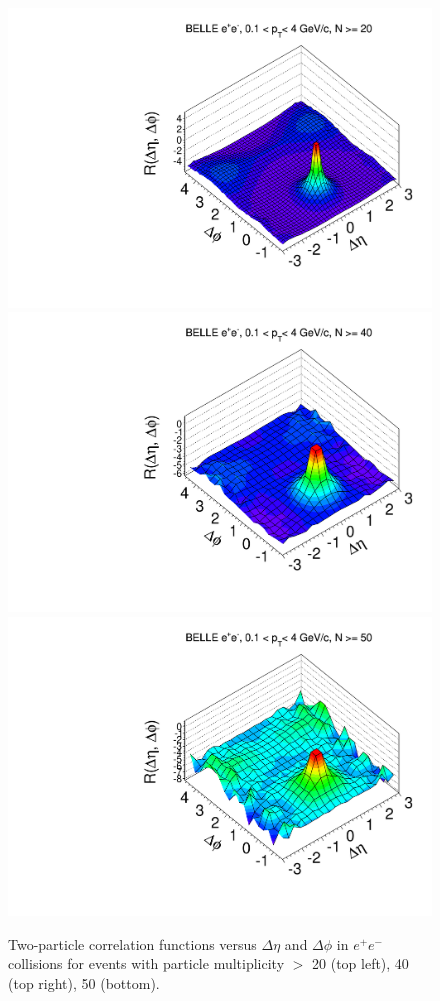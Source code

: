 \documentclass[%
preprint,
 amsmath,amssymb,
 aps,
]{revtex4-1}
\begin{document}
\begin{figure}[!htb]
\begin{center}
\includegraphics[width=.45\textwidth]{figures/canvasRidgeBelleMult20CutHigh0.pdf}
\includegraphics[width=.45\textwidth]{figures/canvasRidgeBelleMult40CutHigh0.pdf}
\includegraphics[width=.45\textwidth]{figures/canvasRidgeBelleMult50CutHigh0.pdf}
\caption{Two-particle correlation functions versus $\Delta\eta$ and $\Delta\phi$ in $e^{+}e^{-}$ collisions for events with particle multiplicity $>$ 20 (top left), 40 (top right), 50 (bottom).}
\label{fig:ridgeBelle} 
\end{center}
\end{figure}
\end{document}
